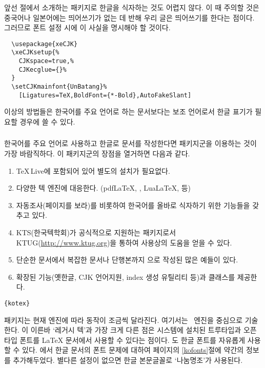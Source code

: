 \medskip 

앞선 절에서 소개하는  패키지로 한글을 식자하는 것도 어렵지 않다. 이 때 주의할 것은
중국어나 일본어에는 띄어쓰기가 없는 데 반해 우리 글은 띄어쓰기를 한다는 점이다. 그러므로 폰트 설정 시에 
이 사실을 명시해야 할 것이다.

\begin{verbatim}
  \usepackage{xeCJK}
  \xeCJKsetup{%
    CJKspace=true,%
    CJKecglue={}%
  }
  \setCJKmainfont{UnBatang}%
    [Ligatures=TeX,BoldFont={*-Bold},AutoFakeSlant]
\end{verbatim}

이상의 방법들은 한국어를 주요 언어로 하는 문서보다는 보조 언어로서 한글 표기가 필요할 경우에 쓸 수 있다.

\subsubsection[kotex]{\texorpdfstring{\koTeX}{koTeX}}
한국어를 주요 언어로 사용하고 한글로 문서를 작성한다면  패키지군을 이용하는 것이 가장 바람직하다.
이 패키지군의 장점을 열거하면 다음과 같다.
\begin{enumerate} \firmlist
  \item \TeX\,Live에 포함되어 있어 별도의 설치가 필요없다.
  \item 다양한 텍 엔진에 대응한다. (pdf\LaTeX, \XeLaTeX, Lua\LaTeX,  등)
  \item 자동조사(\pageref{autojosa}페이지를 보라)를 비롯하여 한국어를 올바로 식자하기 위한 기능들을 갖추고 있다.
  \item KTS(한국텍학회)가 공식적으로 지원하는 패키지로서 KTUG(\url{http://www.ktug.org})을 통하여 사용상의 도움을 얻을 수 있다.
  \item 단순한 문서에서 복잡한 문서나 단행본까지 으로 작성된 많은 예들이 있다.
  \item 확장된 기능(옛한글, CJK 언어지원, index 생성 유틸리티 등)과 클래스를 제공한다.
\end{enumerate}

\begin{lscommand}
  \texttt{\{kotex\}}
\end{lscommand}

 패키지는 현재 엔진에 따라 동작이 조금씩 달라진다. 여기서는 \XeLaTeX\ 엔진을 중심으로 기술한다.
\XeLaTeX 이 이른바 `레거시 텍'과 가장 크게 다른 점은 시스템에 설치된 트루타입과 오픈타입 폰트를 \LaTeX{} 문서에서 사용할 수 있다는 점이다. \koTeX 도 한글 폰트를 자유롭게 사용할 수 있다. \XeLaTeX 에서 한글 문서의 폰트 문제에 대하여 \pageref{kofonts}페이지의 \ref{kofonts}절에 약간의 정보를 추가해두었다. 별다른 설정이 없으면 한글 본문글꼴로 `나눔명조'가 사용된다.

